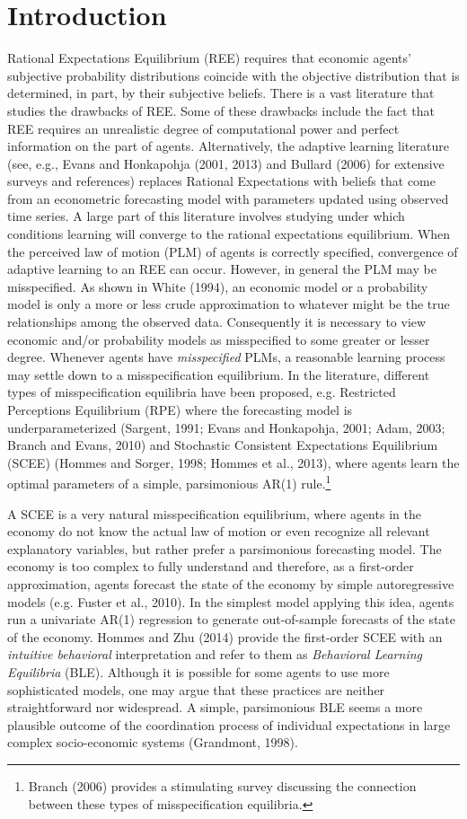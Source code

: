 \newpage
\section{Introduction}
Rational Expectations Equilibrium (REE) requires that economic agents' subjective probability distributions coincide
with the objective distribution that is determined, in part, by
their subjective beliefs. There is a vast literature that studies
the drawbacks of REE. Some of these drawbacks include the fact that
REE requires an unrealistic degree of computational power and perfect
information on the part of agents. Alternatively, the adaptive
learning literature (see, e.g., Evans and Honkapohja (2001, 2013)
and Bullard (2006) for extensive surveys and references) replaces
Rational Expectations with beliefs that come from an econometric
forecasting model with parameters updated using observed time
series. A large part of this literature involves studying under
which conditions learning will converge to the rational expectations
equilibrium. When the perceived law of motion (PLM) of agents is
correctly specified, convergence of adaptive learning to an REE can
occur. However, in general the PLM may be misspecified. As shown in White
(1994), an economic model or a probability model is only
a more or less crude approximation to whatever might be the true
relationships among the observed data. Consequently it is
necessary to view economic and/or probability models as misspecified
to some greater or lesser degree. Whenever agents have {\it misspecified}
PLMs, a reasonable learning process may settle down to a misspecification equilibrium. In the literature, different
types of misspecification equilibria have been proposed, e.g. Restricted Perceptions Equilibrium (RPE) where the forecasting model is underparameterized (Sargent, 1991; Evans and Honkapohja, 2001; Adam, 2003; Branch and Evans, 2010) and Stochastic Consistent Expectations Equilibrium (SCEE) (Hommes and Sorger, 1998; Hommes et al., 2013), where agents learn the optimal parameters of a simple, parsimonious AR(1) rule.\footnote{Branch (2006) provides a stimulating survey discussing the connection between these types of misspecification equilibria.}

A SCEE is a very natural misspecification equilibrium, where agents in the economy do not know the actual law of motion or even recognize all relevant explanatory variables, but rather prefer a parsimonious forecasting model. The economy is too complex to fully understand and therefore, as a first-order approximation, agents forecast the state of the economy by simple autoregressive models (e.g. Fuster et al., 2010).
In the simplest model applying this idea, agents run a univariate AR(1) regression to generate out-of-sample forecasts of the state of
the economy. Hommes and Zhu (2014) provide the first-order SCEE with an \emph{intuitive behavioral}
interpretation and refer to them as  {\it Behavioral Learning Equilibria} (BLE). Although it is possible for some agents to use more sophisticated
models, one may argue that these practices are neither straightforward nor widespread. A simple, parsimonious BLE seems a more plausible outcome of the coordination process of individual expectations in large complex socio-economic systems (Grandmont, 1998).

